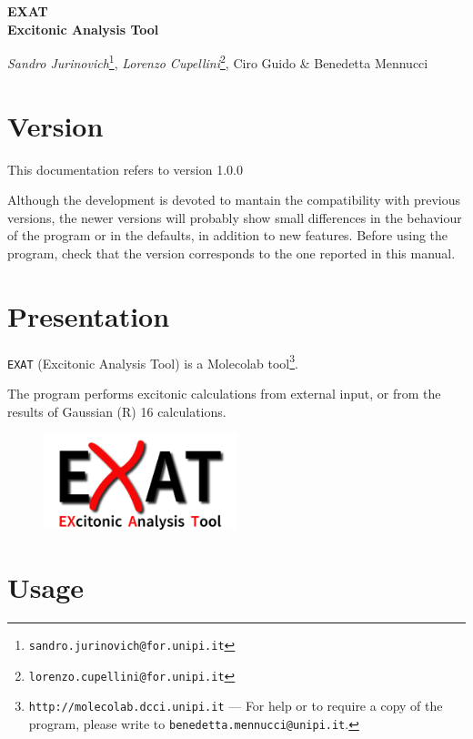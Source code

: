 \documentclass[a4paper,11pt]{article}
\begin{document}
\Large
\begin{center}
\textbf{EXAT \\ Excitonic Analysis Tool}
\end{center}
\normalsize
\begin{center}
\emph{Sandro Jurinovich}\footnote{\texttt{sandro.jurinovich@for.unipi.it}},
\emph{Lorenzo Cupellini}\footnote{\texttt{lorenzo.cupellini@for.unipi.it}},
 Ciro Guido \& Benedetta Mennucci
\end{center}

\section{Version}

This documentation refers to version 1.0.0 

Although the development is devoted to mantain the compatibility with previous versions, the newer versions will probably show small differences in the behaviour of the program or in the defaults, in addition to new features. Before using the program, check that the version corresponds to the one reported in this manual.

\section{Presentation}

\texttt{EXAT} (Excitonic Analysis Tool) is a Molecolab tool\footnote{\texttt{http://molecolab.dcci.unipi.it} ---
For help or to require a copy of the program, please write to
\texttt{benedetta.mennucci@unipi.it}.}. 


The program performs excitonic calculations from external input, or from the results of Gaussian (R) 16 calculations.

\begin{figure}[!hb]
 \centering
 \includegraphics[width=0.5\textwidth]{logo.png}
\end{figure}


\section{Usage}
\end{document}
